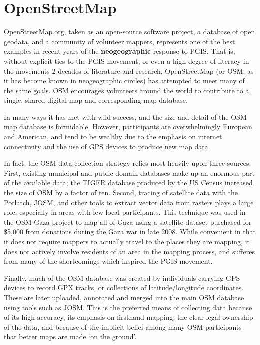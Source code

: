\documentclass[11pt]{report}
\begin{document}
\section{OpenStreetMap}

OpenStreetMap.org, taken as an open-source software project, a database of open geodata, and a community of volunteer mappers, represents one of the best examples in recent years of the \textbf{neogeographic} response to PGIS. That is, without explicit ties to the PGIS movement, or even a high degree of literacy in the movements 2 decades of literature and research, OpenStreetMap (or OSM, as it has become known in neogeographic circles) has attempted to meet many of the same goals. OSM encourages volunteers around the world to contribute to a single, shared digital map and corresponding map database. 

In many ways it has met with wild success, and the size and detail of the OSM map database is formidable. 
However, participants are overwhelmingly European and American, and tend to be wealthy due to the emphasis on internet connectivity and the use of GPS devices to produce new map data.

In fact, the OSM data collection strategy relies most heavily upon three sources. First, existing municipal and public domain databases make up an enormous part of the available data; the TIGER database produced by the US Census increased the size of OSM by a factor of ten. Second, tracing of satellite data with the Potlatch, JOSM, and other tools to extract vector data from rasters plays a large role, especially in areas with few local participants. This technique was used in the OSM Gaza project to map all of Gaza using a satellite dataset purchased for \$5,000 from donations during the Gaza war in late 2008. \cite{maron2010openstreetmap} While convenient in that it does not require mappers to actually travel to the places they are mapping, it does not actively involve residents of an area in the mapping process, and sufferes from many of the shortcomings which inspired the PGIS movement. 

Finally, much of the OSM database was created by individuals carrying GPS devices to record GPX tracks, or collections of latitude/longitude coordinates. These are later uploaded, annotated and merged into the main OSM database using tools such as JOSM. This is the preferred means of collecting data because of its high accuracy, its emphasis on firsthand mapping, the clear legal ownership of the data, and because of the implicit belief among many OSM participants that better maps are made `on the ground'. 
\end{document}
